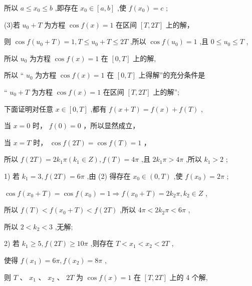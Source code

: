 \documentclass[10pt]{article}
\newcommand*\circled[1]{\tikz[baseline=(char.base)]{\node[shape=circle,draw,inner sep=1.5pt] (char) {\small #1};}}
\begin{document}
所以 \(a \leq  {x}_{0} \leq  b\) ,即存在 \({x}_{0} \in  \left\lbrack  {a,b}\right\rbrack\) ,使 \(f\left( {x}_{0}\right)  = c\) ;

(3)若 \({u}_{0} + T\) 为方程 \(\cos f\left( x\right)  = 1\) 在区间 \(\left\lbrack  {T,{2T}}\right\rbrack\) 上的解，

则 \(\cos f\left( {{u}_{0} + T}\right)  = 1,T \leq  {u}_{0} + T \leq  {2T}\) ,所以 \(\cos f\left( {u}_{0}\right)  = 1\) ,且 \(0 \leq  {u}_{0} \leq  T\) ,

所以 \({u}_{0}\) 为方程 \(\cos f\left( x\right)  = 1\) 在 \(\left\lbrack  {0,T}\right\rbrack\) 上的解,

所以 “ \({u}_{0}\) 为方程 \(\cos f\left( x\right)  = 1\) 在 \(\left\lbrack  {0,T}\right\rbrack\) 上得解”的充分条件是

“ \({u}_{0} + T\) 为方程 \(\cos f\left( x\right)  = 1\) 在区间 \(\left\lbrack  {T,{2T}}\right\rbrack\) 上的解”;

下面证明对任意 \(x \in  \left\lbrack  {0,T}\right\rbrack\) ,都有 \(f\left( {x + T}\right)  = f\left( x\right)  + f\left( T\right)\) ,

 \circled{1}  当 \(x = 0\) 时， \(f\left( 0\right)  = 0\) ，所以显然成立，

 \circled{2}  当 \(x = T\) 时， \(\cos f\left( {2T}\right)  = \cos f\left( T\right)  = 1\) ，

所以 \(f\left( {2T}\right)  = 2{k}_{1}\pi \left( {{k}_{1} \in  Z}\right) ,f\left( T\right)  = {4\pi }\) ,且 \(2{k}_{1}\pi  > {4\pi }\) ,所以 \({k}_{1} > 2\) ;

1) 若 \({k}_{1} = 3,f\left( {2T}\right)  = {6\pi }\) ,由 (2) 得存在 \({x}_{0} \in  \left( {0,T}\right)\) ,使 \(f\left( {x}_{0}\right)  = {2\pi }\) ;

\(\cos f\left( {{x}_{0} + T}\right)  = \cos f\left( {x}_{0}\right)  = 1 \Rightarrow  f\left( {{x}_{0} + T}\right)  = 2{k}_{2}\pi ,{k}_{2} \in  Z\) ,

所以 \(f\left( T\right)  < f\left( {{x}_{0} + T}\right)  < f\left( {2T}\right)\) ,所以 \({4\pi } < 2{k}_{2}\pi  < {6\pi }\) ,

所以 \(2 < {k}_{2} < 3\) ,无解;

2) 若 \({k}_{1} \geq  5,f\left( {2T}\right)  \geq  {10\pi }\) ,则存在 \(T < {x}_{1} < {x}_{2} < {2T}\) ,

使得 \(f\left( {x}_{1}\right)  = {6\pi },f\left( {x}_{2}\right)  = {8\pi }\) ,

则 \(T\text{ 、 }{x}_{1}\text{ 、 }{x}_{2}\text{ 、 }{2T}\) 为 \(\cos f\left( x\right)  = 1\) 在 \(\left\lbrack  {T,{2T}}\right\rbrack\) 上的 4 个解,
\end{document}
